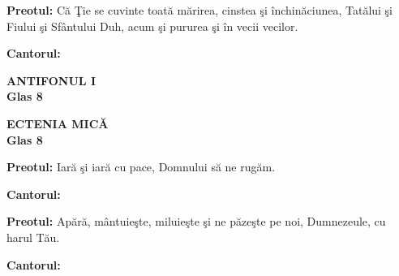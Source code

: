 \documentclass[12pt]{book}
\begin{document}
  {\bf Preotul:} C\u{a} \c{T}ie se cuvinte toat\u{a} m\u{a}rirea,
  cinstea \c{s}i \^{i}nchin\u{a}ciunea, Tat\u{a}lui \c{s}i Fiului
  \c{s}i Sf\^{a}ntului Duh, acum \c{s}i pururea \c{s}i \^{i}n vecii
  vecilor.

  {\bf Cantorul:}
  \begin{figure}[h]
    \begin{center}
    \end{center}
  \end{figure}

  \pagebreak

  \begin{center}
    {\large \bf ANTIFONUL I\\
      Glas 8}
  \end{center}

  \begin{figure}[h]
    \begin{center}
    \end{center}
  \end{figure}

  \pagebreak

  \begin{figure}[h]
    \begin{center}
    \end{center}
  \end{figure}

  \pagebreak

  \begin{center}
    {\large \bf ECTENIA MIC\u{A}\\
      Glas 8}
  \end{center}

  {\bf Preotul:} Iar\u{a} \c{s}i iar\u{a} cu pace, Domnului s\u{a} ne
  rug\u{a}m.

  {\bf Cantorul:}
  \begin{figure}[h]
    \begin{center}
    \end{center}
  \end{figure}

  {\bf Preotul:} Ap\u{a}r\u{a}, m\^{a}ntuie\c{s}te, miluie\c{s}te
  \c{s}i ne p\u{a}ze\c{s}te pe noi, Dumnezeule, cu harul T\u{a}u.

  {\bf Cantorul:}
  \begin{figure}[h]
    \begin{center}
    \end{center}
  \end{figure}
\end{document}

